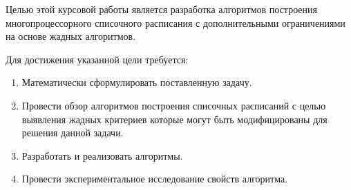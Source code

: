 Целью этой курсовой работы является разработка алгоритмов построения многопроцессорного списочного расписания с дополнительными ограничениями на основе жадных алгоритмов.

Для достижения указанной цели требуется:
\begin{enumerate}
    \item Математически сформулировать поставленную задачу. 
    \item Провести обзор алгоритмов построения списочных расписаний с целью выявления жадных критериев которые могут быть модифицированы для решения данной задачи.
    \item Разработать и реализовать алгоритмы.
    \item Провести экспериментальное исследование свойств алгоритма.
\end{enumerate}